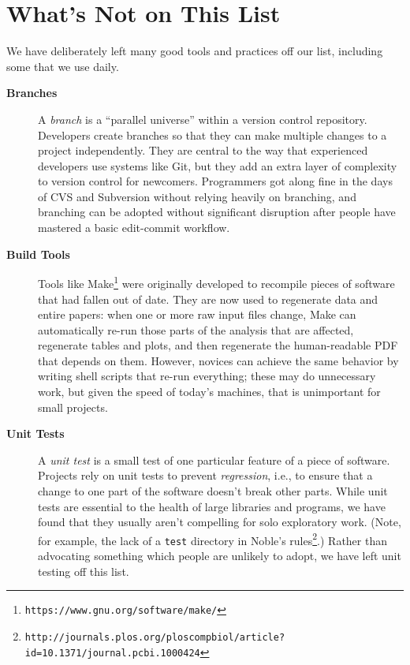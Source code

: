 \documentclass[10pt]{article}
\newcommand{\withurl}[2]{{#1}\footnote{\texttt{#2}}}
\begin{document}
\section{What's Not on This List}\label{whats-not-on-this-list}

We have deliberately left many good tools and practices off our list,
including some that we use daily.

\begin{description}

\item[\textbf{Branches}]
A \emph{branch} is a ``parallel universe'' within a version control
repository. Developers create branches so that they can make multiple
changes to a project independently. They are central to the way that
experienced developers use systems like Git, but they add an extra layer
of complexity to version control for newcomers. Programmers got along
fine in the days of CVS and Subversion without relying heavily on
branching, and branching can be adopted without significant disruption
after people have mastered a basic edit-commit workflow.

\item[\textbf{Build Tools}] Tools like
  \withurl{Make}{https://www.gnu.org/software/make/} were originally
  developed to recompile pieces of software that had fallen out of
  date. They are now used to regenerate data and entire papers: when
  one or more raw input files change, Make can automatically re-run
  those parts of the analysis that are affected, regenerate tables and
  plots, and then regenerate the human-readable PDF that depends on
  them.  However, novices can achieve the same behavior by writing
  shell scripts that re-run everything; these may do unnecessary work,
  but given the speed of today's machines, that is unimportant for
  small projects.

\item[\textbf{Unit Tests}] A \emph{unit test} is a small test of one
  particular feature of a piece of software. Projects rely on unit
  tests to prevent \emph{regression}, i.e., to ensure that a change to
  one part of the software doesn't break other parts. While unit tests
  are essential to the health of large libraries and programs, we have
  found that they usually aren't compelling for solo exploratory
  work. (Note, for example, the lack of a \texttt{test} directory in
  \withurl{Noble's
    rules}{http://journals.plos.org/ploscompbiol/article?id=10.1371/journal.pcbi.1000424}.)
  Rather than advocating something which people are unlikely to adopt,
  we have left unit testing off this list.


\end{description}
\end{document}
